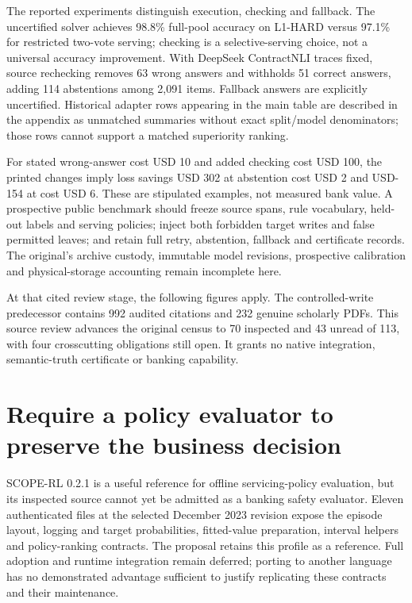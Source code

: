 The reported experiments distinguish execution, checking and fallback.
The uncertified solver achieves 98.8\% full-pool accuracy on L1-HARD
versus 97.1\% for restricted two-vote serving; checking is a
selective-serving choice, not a universal accuracy improvement. With
DeepSeek ContractNLI traces fixed, source rechecking removes 63 wrong
answers and withholds 51 correct answers, adding 114 abstentions among
2,091 items. Fallback answers are explicitly uncertified. Historical
adapter rows appearing in the main table are described in the appendix
as unmatched summaries without exact split/model denominators; those
rows cannot support a matched superiority ranking.
\citep{exec23_controlled_writes_paper,exec23_controlled_writes_reference}

For stated wrong-answer cost USD 10 and added checking cost USD 100, the
printed changes imply loss savings USD 302 at abstention cost USD 2 and
USD-154 at cost USD 6. These are stipulated examples, not measured bank
value. A prospective public benchmark should freeze source spans, rule
vocabulary, held-out labels and serving policies; inject both forbidden
target writes and false permitted leaves; and retain full retry,
abstention, fallback and certificate records. The original's archive
custody, immutable model revisions, prospective calibration and
physical-storage accounting remain incomplete here.
\citep{exec23_controlled_writes_paper,exec23_controlled_writes_reference}

At that cited review stage, the following figures apply. The
controlled-write predecessor contains 992 audited citations and 232
genuine scholarly PDFs. This source review advances the original census
to 70 inspected and 43 unread of 113, with four crosscutting obligations
still open. It grants no native integration, semantic-truth certificate
or banking capability.
\citep{sp23controlled_reader,sp23controlled_progress}

\hypertarget{require-a-policy-evaluator-to-preserve-the-business-decision}{%
\section{Require a policy evaluator to preserve the business
decision}\label{require-a-policy-evaluator-to-preserve-the-business-decision}}

SCOPE-RL 0.2.1 is a useful reference for offline servicing-policy
evaluation, but its inspected source cannot yet be admitted as a banking
safety evaluator. Eleven authenticated files at the selected December
2023 revision expose the episode layout, logging and target
probabilities, fitted-value preparation, interval helpers and
policy-ranking contracts. The proposal retains this profile as a
reference. Full adoption and runtime integration remain deferred;
porting to another language has no demonstrated advantage sufficient to
justify replicating these contracts and their maintenance.
\citep{exec23_scope_rl_sources}


